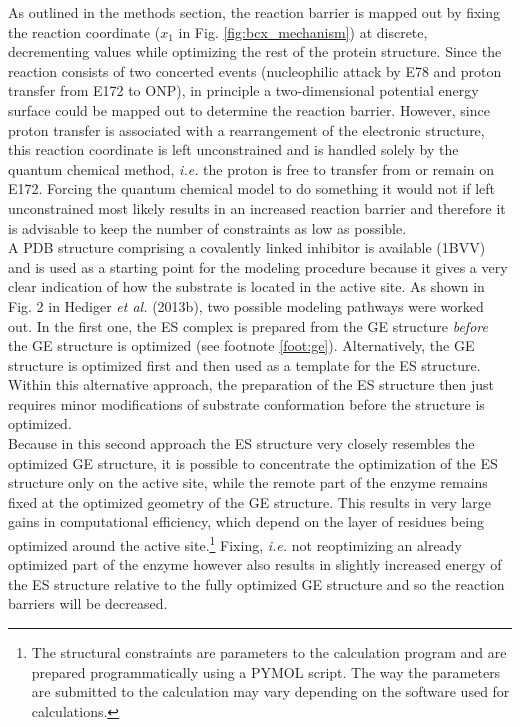 As outlined in the methods section, the reaction barrier is mapped out by fixing the reaction coordinate ($x_1$ in Fig. \ref{fig:bcx_mechanism}) at discrete, decrementing values while optimizing the rest of the protein structure.
Since the reaction consists of two concerted events (nucleophilic attack by E78 and proton transfer from E172 to ONP), in principle a two-dimensional potential energy surface could be mapped out to determine the reaction barrier.
However, since proton transfer is associated with a rearrangement of the electronic structure, this reaction coordinate is left unconstrained and is handled solely by the quantum chemical method, \textit{i.e.} the proton is free to transfer from or remain on E172.
Forcing the quantum chemical model to do something it would not if left unconstrained most likely results in an increased reaction barrier and therefore it is advisable to keep the number of constraints as low as possible.\\
A PDB structure comprising a covalently linked inhibitor is available (1BVV) and is used as a starting point for the modeling procedure because it gives a very clear indication of how the substrate is located in the active site.
As shown in Fig. 2 in Hediger \textit{et al.} (2013b), two possible modeling pathways were worked out.
In the first one, the ES complex is prepared from the GE structure \textit{before} the GE structure is optimized (see footnote \ref{foot:ge}).
Alternatively, the GE structure is optimized first and then used as a template for the ES structure.
Within this alternative approach, the preparation of the ES structure then just requires minor modifications of substrate conformation before the structure is optimized.\\
Because in this second approach the ES structure very closely resembles the optimized GE structure, it is possible to concentrate the optimization of the ES structure only on the active site, while the remote part of the enzyme remains fixed at the optimized geometry of the GE structure.
This results in very large gains in computational efficiency, which depend on the layer of residues being optimized around the active site.\footnote{The structural constraints are parameters to the calculation program and are prepared programmatically using a PYMOL script. The way the parameters are submitted to the calculation may vary depending on the software used for calculations.}
Fixing, \textit{i.e.} not reoptimizing an already optimized part of the enzyme however also results in slightly increased energy of the ES structure relative to the fully optimized GE structure and so the reaction barriers will be decreased.
